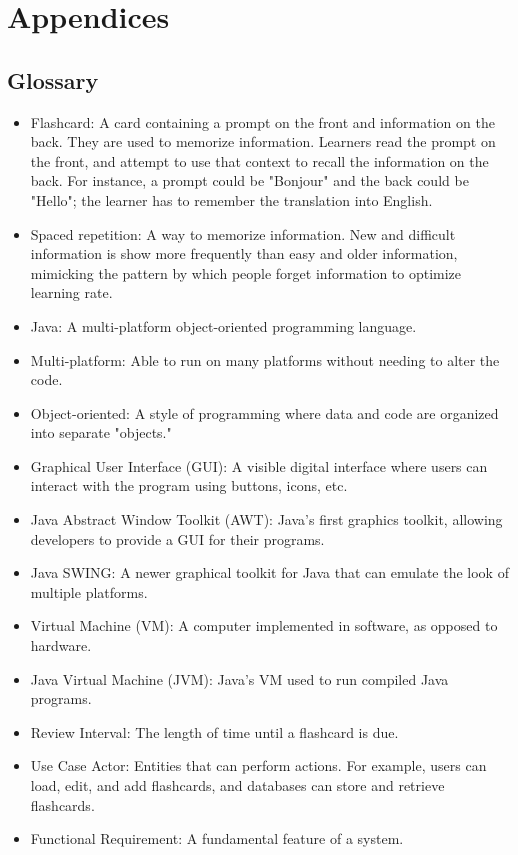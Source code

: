 \documentclass{scrreprt}
\begin{document}
\chapter{Appendices}

\section{Glossary}
\begin{itemize}
    \item Flashcard: A card containing a prompt on the front and information on the back.
        They are used to memorize information.
        Learners read the prompt on the front, and attempt to use that context to recall the information on the back.
        For instance, a prompt could be "Bonjour" and the back could be "Hello"; the learner has to remember the translation into English.
    \item Spaced repetition: A way to memorize information. New and difficult information
        is show more frequently than easy and older information, mimicking the pattern
        by which people forget information to optimize learning rate.
    \item Java: A multi-platform object-oriented programming language.
    \item Multi-platform: Able to run on many platforms without needing to alter the code.
    \item Object-oriented: A style of programming where data and code are organized into
        separate "objects."
    \item Graphical User Interface (GUI): A visible digital interface where users can 
        interact with the program using buttons, icons, etc.
    \item Java Abstract Window Toolkit (AWT): Java's first graphics toolkit, allowing developers
        to provide a GUI for their programs.
    \item Java SWING: A newer graphical toolkit for Java that can emulate the look of multiple platforms.
    \item Virtual Machine (VM): A computer implemented in software, as opposed to hardware.
    \item Java Virtual Machine (JVM): Java's VM used to run compiled Java programs.
    \item Review Interval: The length of time until a flashcard is due.
    \item Use Case Actor: Entities that can perform actions. For example, users can load, edit, and add flashcards, and databases can store and retrieve flashcards.
    \item Functional Requirement: A fundamental feature of a system.

\end{itemize}
\end{document}
